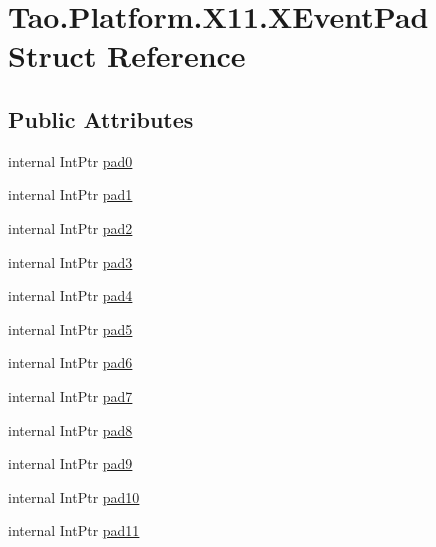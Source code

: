 \hypertarget{struct_tao_1_1_platform_1_1_x11_1_1_x_event_pad}{
\section{Tao.Platform.X11.XEventPad Struct Reference}
\label{struct_tao_1_1_platform_1_1_x11_1_1_x_event_pad}
}
\subsection*{Public Attributes}
\begin{DoxyCompactItemize}
\item 
internal IntPtr \hyperlink{struct_tao_1_1_platform_1_1_x11_1_1_x_event_pad_acc4a291626b0a0c83b5bb98e8a1a8871}{pad0}
\item 
internal IntPtr \hyperlink{struct_tao_1_1_platform_1_1_x11_1_1_x_event_pad_a88f4857ef53b9974b99e92f89b43a621}{pad1}
\item 
internal IntPtr \hyperlink{struct_tao_1_1_platform_1_1_x11_1_1_x_event_pad_a10b0aed96a51c3d36856e3f046d1264d}{pad2}
\item 
internal IntPtr \hyperlink{struct_tao_1_1_platform_1_1_x11_1_1_x_event_pad_a206e3940fbe55d833b3dc28b1f695cd1}{pad3}
\item 
internal IntPtr \hyperlink{struct_tao_1_1_platform_1_1_x11_1_1_x_event_pad_a6b5c66e94fa2d12932cf877fbe2202a5}{pad4}
\item 
internal IntPtr \hyperlink{struct_tao_1_1_platform_1_1_x11_1_1_x_event_pad_a8a9dec194c148165a220fc7d0d8b589f}{pad5}
\item 
internal IntPtr \hyperlink{struct_tao_1_1_platform_1_1_x11_1_1_x_event_pad_a3a99a4d874675c56f97372fbffcac665}{pad6}
\item 
internal IntPtr \hyperlink{struct_tao_1_1_platform_1_1_x11_1_1_x_event_pad_afc601a303f83633f847cd2fdddabcf4b}{pad7}
\item 
internal IntPtr \hyperlink{struct_tao_1_1_platform_1_1_x11_1_1_x_event_pad_a4853f1a787127bac1c529011d3954da7}{pad8}
\item 
internal IntPtr \hyperlink{struct_tao_1_1_platform_1_1_x11_1_1_x_event_pad_a2450e40e8aae7029a629b7ab017ebdb2}{pad9}
\item 
internal IntPtr \hyperlink{struct_tao_1_1_platform_1_1_x11_1_1_x_event_pad_a4f85a9b1f91e5350543672de5a1ce07a}{pad10}
\item 
internal IntPtr \hyperlink{struct_tao_1_1_platform_1_1_x11_1_1_x_event_pad_a7e82eada3d8d9fadc7e66c99a8574fc9}{pad11}

\end{DoxyCompactItemize}

